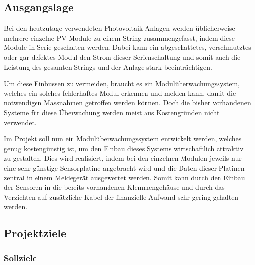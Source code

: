 \subsection{Ausgangslage}

Bei  den heutzutage  verwendeten  Photovoltaik-Anlagen werden  \"ublicherweise
mehrere einzelne PV-Module zu einem String zusammengefasst, indem diese Module
in Serie geschalten werden. Dabei  kann ein abgeschattetes, verschmutztes oder
gar  defektes  Modul den  Strom  dieser  Serienschaltung  und somit  auch  die
Leistung des gesamten Strings und der Anlage stark beeintr\"achtigen.

Um  diese Einbussen  zu vermeiden,  braucht es  ein Modul\"uberwachungssystem,
welches ein  solches fehlerhaftes  Modul erkennen und  melden kann,  damit die
notwendigen Massnahmen getroffen werden  k\"onnen. Doch die bisher vorhandenen
Systeme  f\"ur  diese \"Uberwachung  werden  meist  aus Kostengr\"unden  nicht
verwendet.

Im Projekt  soll nun ein Modul\"uberwachungssystem  entwickelt werden, welches
genug  kosteng\"unstig  ist, um   den  Einbau  dieses  Systems  wirtschaftlich
attraktiv zu gestalten. Dies wird realisiert,  indem bei den einzelnen Modulen
jeweils nur eine  sehr g\"unstige Sensorplatine angebracht wird  und die Daten
dieser Platinen  zentral in einem Meldeger\"at  ausgewertet werden. Somit kann
durch den Einbau der Sensoren  in die bereits vorhandenen Klemmengeh\"ause und
durch  das Verzichten  auf zus\"atzliche  Kabel der  finanzielle Aufwand  sehr
gering gehalten werden.


\subsection{Projektziele}

\subsubsection{Sollziele}

